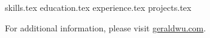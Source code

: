 \documentclass[12pt, letter]{awesome-cv}
\newcommand*{\sectiondir}{resume/}
\begin{document}
\makecvheader

{skills.tex}
{education.tex}
{experience.tex}
{projects.tex}
\vspace{-2mm}
\begin{center}
For additional information, please visit \href{https://geraldwu.com}{geraldwu.com}.
\end{center}
\end{document}
